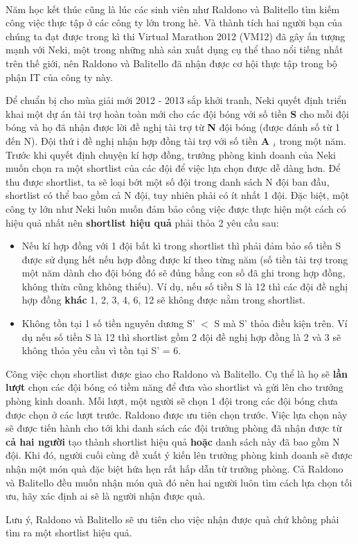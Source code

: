  

Năm học kết thúc cũng là lúc các sinh viên như Raldono và Balitello tìm kiếm công việc thực tập ở các công ty lớn trong hè. Và thành tích hai người bạn của chúng ta đạt được trong kì thi Virtual Marathon 2012 (VM12) đã gây ấn tượng mạnh với Neki, một trong những nhà sản xuất dụng cụ thể thao nổi tiếng nhất trên thế giới, nên Raldono và Balitello đã nhận được cơ hội thực tập trong bộ phận IT của công ty này.

Để chuẩn bị cho mùa giải mới 2012 - 2013 sắp khởi tranh, Neki quyết định triển khai một dự án tài trợ hoàn toàn mới cho các đội bóng với số tiền \textbf{ S } cho mỗi đội bóng và họ đã nhận được lời đề nghị tài trợ từ \textbf{ N } đội bóng (được đánh số từ 1 đến N). Đội thứ i đề nghị nhận hợp đồng tài trợ với số tiền \textbf{ A $_ i $} trong một năm. Trước khi quyết định chuyện kí hợp đồng, trưởng phòng kinh doanh của Neki muốn chọn ra một shortlist của các đội để việc lựa chọn được dễ dàng hơn. Để thu được shortlist, ta sẽ loại bớt một số đội trong danh sách N đội ban đầu, shortlist có thể bao gồm cả N đội, tuy nhiên phải có ít nhất 1 đội. Đặc biệt, một công ty lớn như Neki luôn muốn đảm bảo công việc được thực hiện một cách có hiệu quả nhất nên \textbf{ shortlist hiệu quả } phải thỏa 2 yêu cầu sau:
\begin{itemize}
	\item Nếu kí hợp đồng với 1 đội bất kì trong shortlist thì phải đảm bảo số tiền S được sử dụng hết nếu hợp đồng được kí theo từng năm (số tiền tài trợ trong một năm dành cho đội bóng đó sẽ đúng bằng con số đã ghi trong hợp đồng, không thừa cũng không thiếu). Ví dụ, nếu số tiền S là 12 thì các đội đề nghị hợp đồng \textbf{ khác } 1, 2, 3, 4, 6, 12 sẽ không được nằm trong shortlist.
\end{itemize}
\begin{itemize}
	\item Không tồn tại 1 số tiền nguyên dương S' $<$ S mà S' thỏa điều kiện trên. Ví dụ nếu số tiền S là 12 thì shortlist gồm 2 đội đề nghị hợp đồng là 2 và 3 sẽ không thỏa yêu cầu vì tồn tại S' = 6.
\end{itemize}

Công việc chọn shortlist được giao cho Raldono và Balitello. Cụ thể là họ sẽ \textbf{ lần lượt } chọn các đội bóng có tiềm năng để đưa vào shortlist và gửi lên cho trưởng phòng kinh doanh. Mỗi lượt, một người sẽ chọn 1 đội trong các đội bóng chưa được chọn ở các lượt trước. Raldono được ưu tiên chọn trước. Việc lựa chọn này sẽ được tiến hành cho tới khi danh sách các đội trưởng phòng đã nhận được từ \textbf{ cả hai người } tạo thành shortlist hiệu quả \textbf{ hoặc } danh sách này đã bao gồm N đội. Khi đó, người cuối cùng đề xuất ý kiến lên trưởng phòng kinh doanh sẽ được nhận một món quà đặc biệt hứa hẹn rất hấp dẫn từ trưởng phòng. Cả Raldono và Balitello đều muốn nhận món quà đó nên hai người luôn tìm cách lựa chọn tối ưu, hãy xác định ai sẽ là người nhận được quà.

Lưu ý, Raldono và Balitello sẽ ưu tiên cho việc nhận được quà chứ không phải tìm ra một shortlist hiệu quả.